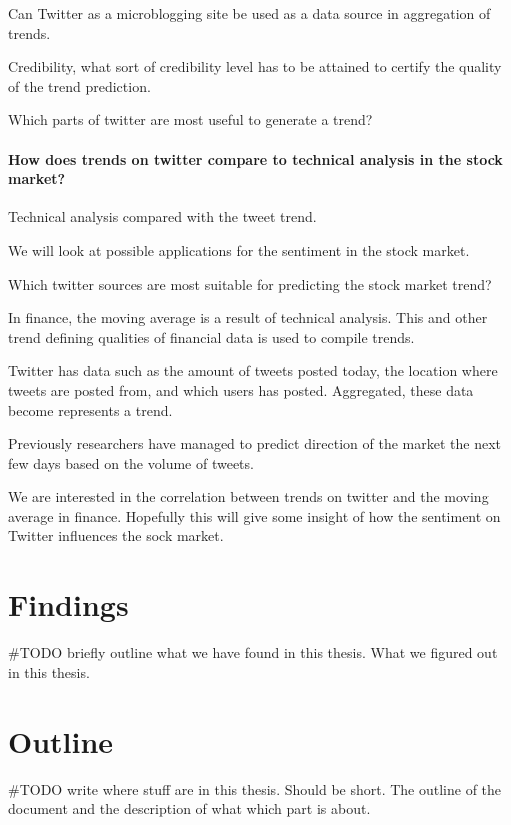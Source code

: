 Can Twitter as a microblogging site be used as a data source in aggregation of trends.

Credibility, what sort of credibility level has to be attained to certify the
quality of the trend prediction. 

Which parts of twitter are most useful to generate a trend?

\paragraph{How does trends on twitter compare to technical analysis in the
stock market?\\}
Technical analysis compared with the tweet trend.

We will look at possible applications for the sentiment in the stock market.

Which twitter sources are most suitable for predicting the stock market
trend?

In finance, the moving average is a result of technical analysis. This and
other trend defining qualities of financial data is used to compile trends. 

Twitter has data such as the amount of tweets posted today, the location where
tweets are posted from, and which users has posted. Aggregated, these data
become represents a trend.  

Previously researchers have managed to predict direction of the market the
next few days based on the volume of tweets. 

We are interested in the correlation between trends on twitter and the moving
average in finance. Hopefully this will give some insight of how the sentiment on
Twitter influences the sock market.  

\section{Findings}
#TODO briefly outline what we have found in this thesis. 
What we figured out in this thesis. 

\section{Outline}
#TODO write where stuff are in this thesis. Should be short. 
The outline of the document and the description of what which part is about. 



